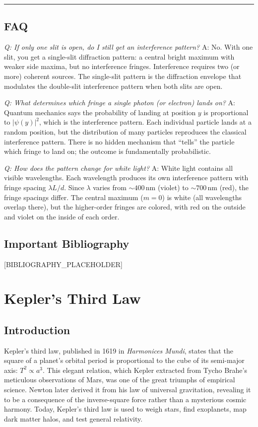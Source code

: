 \documentclass[11pt,openright]{book}
\begin{document}
\bigskip
\hrule
\bigskip
\section*{FAQ}

\textit{Q: If only one slit is open, do I still get an interference pattern?}
A: No. With one slit, you get a single-slit diffraction pattern: a central bright maximum with weaker side maxima, but no interference fringes. Interference requires two (or more) coherent sources. The single-slit pattern is the diffraction envelope that modulates the double-slit interference pattern when both slits are open.

\textit{Q: What determines which fringe a single photon (or electron) lands on?}
A: Quantum mechanics says the probability of landing at position $y$ is proportional to $|\psi(y)|^2$, which is the interference pattern. Each individual particle lands at a random position, but the distribution of many particles reproduces the classical interference pattern. There is no hidden mechanism that ``tells'' the particle which fringe to land on; the outcome is fundamentally probabilistic.

\textit{Q: How does the pattern change for white light?}
A: White light contains all visible wavelengths. Each wavelength produces its own interference pattern with fringe spacing $\lambda L/d$. Since $\lambda$ varies from $\sim 400\,\text{nm}$ (violet) to $\sim 700\,\text{nm}$ (red), the fringe spacings differ. The central maximum ($m = 0$) is white (all wavelengths overlap there), but the higher-order fringes are colored, with red on the outside and violet on the inside of each order.
\section*{Important Bibliography}

[BIBLIOGRAPHY_PLACEHOLDER]


\chapter{Kepler's Third Law}

\section*{Introduction}

Kepler's third law, published in 1619 in \textit{Harmonices Mundi}, states that the square of a planet's orbital period is proportional to the cube of its semi-major axis: $T^2 \propto a^3$. This elegant relation, which Kepler extracted from Tycho Brahe's meticulous observations of Mars, was one of the great triumphs of empirical science. Newton later derived it from his law of universal gravitation, revealing it to be a consequence of the inverse-square force rather than a mysterious cosmic harmony. Today, Kepler's third law is used to weigh stars, find exoplanets, map dark matter halos, and test general relativity.
\end{document}
